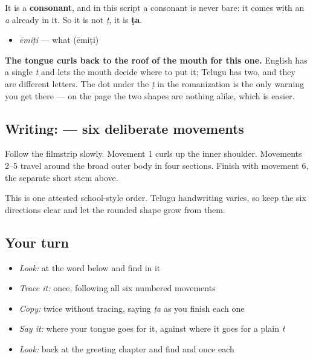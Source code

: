 It is a \textbf{consonant}, and in this script a consonant is never bare: it comes with an \emph{a} already in it. So it is not \emph{ṭ}, it is \textbf{ṭa}.

\begin{itemize}
\raggedright
  \item \textbf{} \emph{ēmiṭi} — what (ēmiṭi)
\end{itemize}

\textbf{The tongue curls back to the roof of the mouth for this one.} English has a single \emph{t} and lets the mouth decide where to put it; Telugu has two, and they are different letters. The dot under the \emph{ṭ} in the romanization is the only warning you get there — on the page the two shapes are nothing alike, which is easier.

\subsection*{Writing:  — six deliberate movements}

Follow the filmstrip slowly. Movement 1 curls up the inner shoulder. Movements 2–5 travel around the broad outer body in four sections. Finish with movement 6, the separate short stem above.

This is one attested school-style order. Telugu handwriting varies, so keep the six directions clear and let the rounded shape grow from them.

\subsection*{Your turn}
\begin{itemize}
\raggedright
  \item \emph{Look:} at the word below and find  in it
\end{itemize}

\begin{quote}
\end{quote}

\begin{itemize}
\raggedright
  \item \emph{Trace it:}  once, following all six numbered movements
  \item \emph{Copy:}  twice without tracing, saying \emph{ṭa} as you finish each one
  \item \emph{Say it:} where your tongue goes for it, against where it goes for a plain \emph{t}
  \item \emph{Look:} back at the greeting chapter and find  and  once each
\end{itemize}

